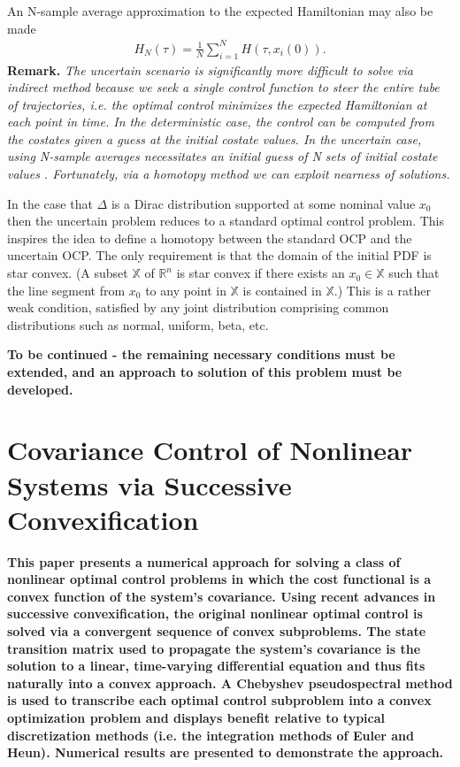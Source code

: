 \documentclass[10pt,a4paper]{article}
\begin{document}
	An N-sample average approximation to the expected Hamiltonian may also be made
	\begin{align}
		H_N(\tau) = \frac{1}{N}\sum_{i=1}^{N}H(\tau,x_i(0)). \label{eq_saa_hamil}
	\end{align}	
	\textbf{Remark.} \textit{The uncertain scenario is significantly more difficult to solve via indirect method because we seek a single control function to steer the entire tube of trajectories, i.e. the optimal control minimizes the expected Hamiltonian at each point in time. In the deterministic case, the control can be computed from the costates given a guess at the initial costate values. In the uncertain case, using N-sample averages necessitates an initial guess of N sets of initial costate values . Fortunately, via a homotopy method we can exploit nearness of solutions.}	
		
		
	In the case that $\Delta$ is a Dirac distribution supported at some nominal value $x_0$ then the uncertain problem reduces to a standard optimal control problem. This inspires the idea to define a homotopy between the standard OCP and the uncertain OCP. The only requirement is that the domain of the initial PDF is star convex. (A subset $ \mathbb{X} $ of $\mathbb{R}^n$ is star convex if there exists an $ x_0 \in\mathbb{ X}$ such that the line segment from $x_0$ to any point in $ \mathbb{X} $ is contained in $ \mathbb{X} $.) This is a rather weak condition, satisfied by any joint distribution comprising common distributions such as normal, uniform, beta, etc.
	
	\textbf{To be continued - the remaining necessary conditions must be extended, and an approach to solution of this problem must be developed.}

	\section{Covariance Control of Nonlinear Systems via Successive Convexification}
	\textbf{This paper presents a numerical approach for solving a class of nonlinear optimal control problems in which the cost functional is a convex function of the system's covariance. Using recent advances in successive convexification, the original nonlinear optimal control is solved via a convergent sequence of convex subproblems. The state transition matrix used to propagate the system's covariance is the solution to a linear, time-varying differential equation and thus fits naturally into a convex approach. A Chebyshev pseudospectral method is used to transcribe each optimal control subproblem into a convex optimization problem and displays benefit relative to typical discretization methods (i.e. the integration methods of Euler and Heun). Numerical results are presented to demonstrate the approach.}
	
\end{document}
